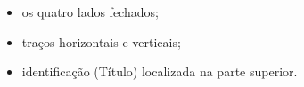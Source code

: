 \begin{itemize}
	\item os quatro lados fechados;
	\item traços horizontais e verticais;
	\item identificação (Título) localizada na parte superior.
\end{itemize}